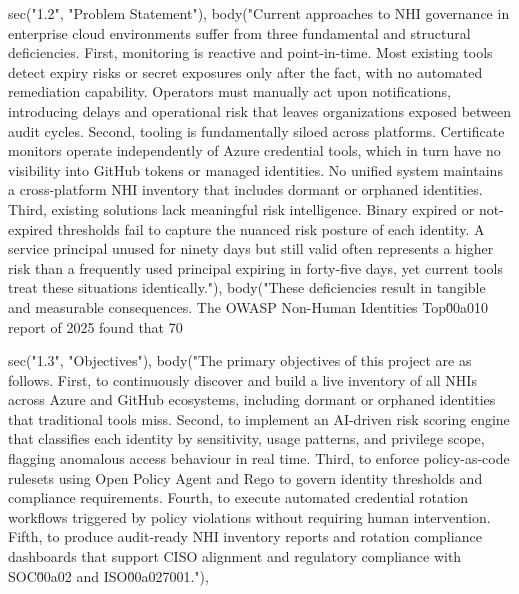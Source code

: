   sec("1.2", "Problem Statement"),
  body("Current approaches to NHI governance in enterprise cloud environments suffer from three fundamental and structural deficiencies. First, monitoring is reactive and point-in-time. Most existing tools detect expiry risks or secret exposures only after the fact, with no automated remediation capability. Operators must manually act upon notifications, introducing delays and operational risk that leaves organizations exposed between audit cycles. Second, tooling is fundamentally siloed across platforms. Certificate monitors operate independently of Azure credential tools, which in turn have no visibility into GitHub tokens or managed identities. No unified system maintains a cross-platform NHI inventory that includes dormant or orphaned identities. Third, existing solutions lack meaningful risk intelligence. Binary expired or not-expired thresholds fail to capture the nuanced risk posture of each identity. A service principal unused for ninety days but still valid often represents a higher risk than a frequently used principal expiring in forty-five days, yet current tools treat these situations identically."),
  body("These deficiencies result in tangible and measurable consequences. The OWASP Non-Human Identities Top\u00a010 report of 2025 found that 70%

  sec("1.3", "Objectives"),
  body("The primary objectives of this project are as follows. First, to continuously discover and build a live inventory of all NHIs across Azure and GitHub ecosystems, including dormant or orphaned identities that traditional tools miss. Second, to implement an AI-driven risk scoring engine that classifies each identity by sensitivity, usage patterns, and privilege scope, flagging anomalous access behaviour in real time. Third, to enforce policy-as-code rulesets using Open Policy Agent and Rego to govern identity thresholds and compliance requirements. Fourth, to execute automated credential rotation workflows triggered by policy violations without requiring human intervention. Fifth, to produce audit-ready NHI inventory reports and rotation compliance dashboards that support CISO alignment and regulatory compliance with SOC\u00a02 and ISO\u00a027001."),

